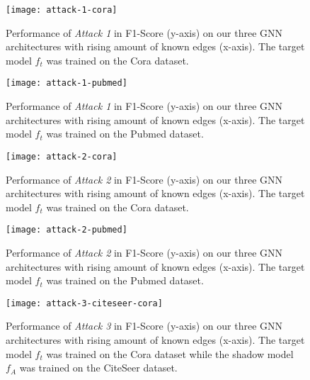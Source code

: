     \begin{figure}[h]
      \begin{center}
        \texttt{[image: attack-1-cora]}
        \caption[Attack 1 - $D_{f_t} = Cora$]{Performance of \emph{Attack 1} in F1-Score (y-axis) on our three GNN architectures with rising amount of known edges (x-axis). The target model $f_t$ was trained on the Cora dataset.}
        \label{figure:eval-att1-cora}
      \end{center}
    \end{figure}

    \begin{figure}[h]
      \begin{center}
        \texttt{[image: attack-1-pubmed]}
        \caption[Attack 1 - $D_{f_t} = Pubmed$]{Performance of \emph{Attack 1} in F1-Score (y-axis) on our three GNN architectures with rising amount of known edges (x-axis). The target model $f_t$ was trained on the Pubmed dataset.}
        \label{figure:eval-att1-pubmed}
      \end{center}
    \end{figure}

    \begin{figure}[h]
      \begin{center}
          \texttt{[image: attack-2-cora]}
          \caption[Attack 2 - $D_{f_t} = Cora$]{Performance of \emph{Attack 2} in F1-Score (y-axis) on our three GNN architectures with rising amount of known edges (x-axis). The target model $f_t$ was trained on the Cora dataset.}
          \label{figure:eval-att2-cora}
      \end{center}
    \end{figure}

    \begin{figure}[h]
      \begin{center}
          \texttt{[image: attack-2-pubmed]}
          \caption[Attack 2 - $D_{f_t} = Pubmed$]{Performance of \emph{Attack 2} in F1-Score (y-axis) on our three GNN architectures with rising amount of known edges (x-axis). The target model $f_t$ was trained on the Pubmed dataset.}
          \label{figure:eval-att2-pubmed}
      \end{center}
    \end{figure}

    \begin{figure}[h]
      \begin{center}
          \texttt{[image: attack-3-citeseer-cora]}
          \caption[Attack 3 - $D_{f_t} = Cora$ and $D_A = CiteSeer$]{Performance of \emph{Attack 3} in F1-Score (y-axis) on our three GNN architectures with rising amount of known edges (x-axis). The target model $f_t$ was trained on the Cora dataset while the shadow model $f_A$ was trained on the CiteSeer dataset.}
          \label{figure:eval-att3-citeseer-cora}
      \end{center}
  \end{figure}

